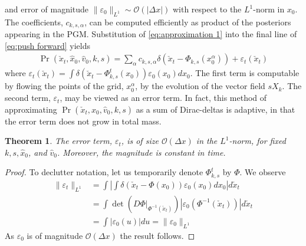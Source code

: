 \documentclass[conference]{IEEEtran}
\newtheorem{thm}{Theorem}
\begin{document}
and error of magnitude $\| \varepsilon_0 \|_{L^1} \sim \mathcal{O}( | \Delta x | )$ with respect to the $L^1$-norm in $x_0$.
The coefficients, $c_{k,s,\alpha}$, can be computed efficiently as product of the posteriors appearing in the PGM.
Substitution of \eqref{eq:approximation 1} into the final line of \eqref{eq:push forward} yields
\begin{align*}
	\Pr( \check{x}_t , \hat{x}_0, \hat{v}_0, k,s) = \sum_\alpha c_{k,s,\alpha} \delta \left( \check{x}_t - \Phi_{k,s}( x_0^\alpha) \right) + \varepsilon_t( \check{x}_t)
\end{align*}
where $\varepsilon_t( \check{x}_t) = \int \delta\left( \check{x}_t - \Phi_{k,s}^{t}( x_0) \right)  \varepsilon_0(x_0) dx_0$.
The first term is computable by flowing the points of the grid, $x_0^\alpha$, by the evolution of the vector field $s X_k$.
The second term, $\varepsilon_t$, may be viewed as an error term.
In fact, this method of approximating $\Pr( \check{x}_t , \hat{x}_0, \hat{v}_0, k,s)$ as a sum of Dirac-deltas is adaptive, in that the error term does not grow in total mass.

\begin{thm} \label{thm:error}
	The error term, $\varepsilon_t$, is of size $\mathcal{O}( \Delta x)$ in the $L^1$-norm, for fixed $k,s,\hat{x}_0$, and $\hat{v}_0$.
	Moreover, the magnitude is constant in time.
\end{thm}
\begin{proof}
	To declutter notation, let us temporarily denote $\Phi_{k,s}^t$ by $\Phi$.
	We observe
\begin{align*}
	\| \varepsilon_t \|_{L^1} &= \int \left| \int \delta( \check{x}_t - \Phi(x_0) ) \varepsilon_0(x_0) dx_0 \right| d\check{x}_t \\
	&= \int \det( \left. D\Phi \right|_{\Phi^{-1}( \check{x}_t) }) |\varepsilon_{0}( \Phi^{-1}( \check{x}_t )) | d\check{x}_t \\
	&= \int | \varepsilon_0( u) | du = \| \varepsilon_0 \|_{L^1}
\end{align*}
As $\varepsilon_0$ is of magnitude $\mathcal{O}( \Delta x)$ the result follows.
\end{proof}
\end{document}
